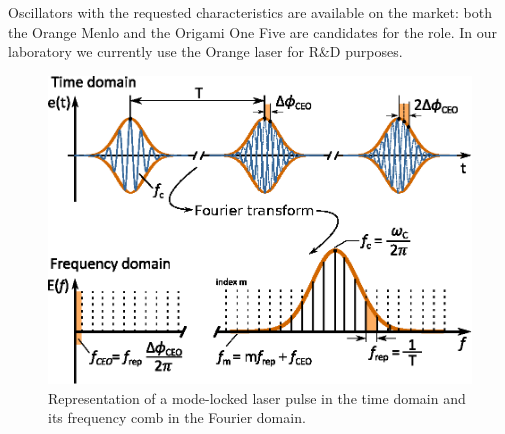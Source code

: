 Oscillators with the requested characteristics are available on the market: both the Orange Menlo and the Origami One Five are candidates for the role. In our laboratory we currently use the Orange laser for R\&D purposes.

\begin{figure}
	\centering
	\includegraphics[width=0.9\linewidth]{images/comb.eps}
	\caption{Representation of a mode-locked laser pulse in the time domain and its frequency comb in the Fourier domain.}
	\label{fig:comb}
\end{figure}

